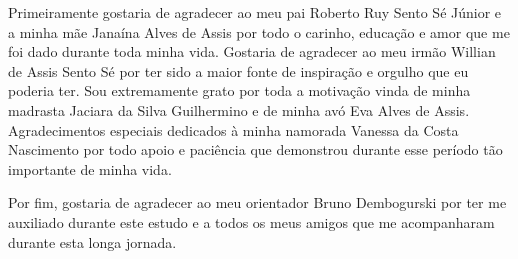 Primeiramente gostaria de agradecer ao meu pai Roberto Ruy Sento Sé Júnior e a minha mãe Janaína Alves de Assis por todo o carinho, educação e amor que me foi dado durante toda minha vida. Gostaria de agradecer ao meu irmão Willian de Assis Sento Sé por ter sido a maior fonte de inspiração e orgulho que eu poderia ter. Sou extremamente grato por toda a motivação vinda de minha madrasta Jaciara da Silva Guilhermino e de minha avó Eva Alves de Assis. Agradecimentos especiais dedicados à minha namorada Vanessa da Costa Nascimento por todo apoio e paciência que demonstrou durante esse período tão importante de minha vida.

Por fim, gostaria de agradecer ao meu orientador Bruno Dembogurski por ter me auxiliado durante este estudo e a todos os meus amigos que me acompanharam durante esta longa jornada. 